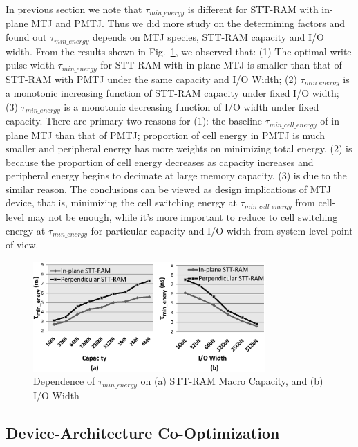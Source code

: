 In previous section we note that $\tau_{min\_energy}$ is different for STT-RAM with in-plane MTJ and PMTJ. Thus we did more study on the determining factors and found out $\tau_{min\_energy}$ depends on MTJ species, STT-RAM capacity and I/O width. From the results shown in Fig.~\ref{fig:minenergy}, we observed that: (1) The optimal write pulse width $\tau_{min\_energy}$ for STT-RAM with in-plane MTJ is smaller than that of STT-RAM with PMTJ under the same capacity and I/O Width; (2) $\tau_{min\_energy}$ is a monotonic increasing function of STT-RAM capacity under fixed I/O width; (3) $\tau_{min\_energy}$ is a monotonic decreasing function of I/O width under fixed capacity. There are primary two reasons for (1): the baseline $\tau_{min\_cell\_energy}$ of in-plane MTJ than that of PMTJ; proportion of cell energy in PMTJ is much smaller and peripheral energy has more weights on minimizing total energy. (2) is because the proportion of cell energy decreases as capacity increases and peripheral energy begins to decimate at large memory capacity. (3) is due to the similar reason. The conclusions can be viewed as design implications of MTJ device, that is, minimizing the cell switching energy at $\tau_{min\_cell\_energy}$ from cell-level may not be enough, while it's more important to reduce to cell switching energy at $\tau_{min\_energy}$ for particular capacity and I/O width from system-level point of view.


\begin{figure}[t]
  \centering
  \includegraphics[width=3.5in]{fig/MinEnergy.eps}
  \vspace{-10pt}
  \caption{Dependence of $\tau_{min\_energy}$ on (a) STT-RAM Macro Capacity, and (b) I/O Width}
  \label{fig:minenergy}
  \vspace{-15pt}
\end{figure}

\subsection{Device-Architecture Co-Optimization}

